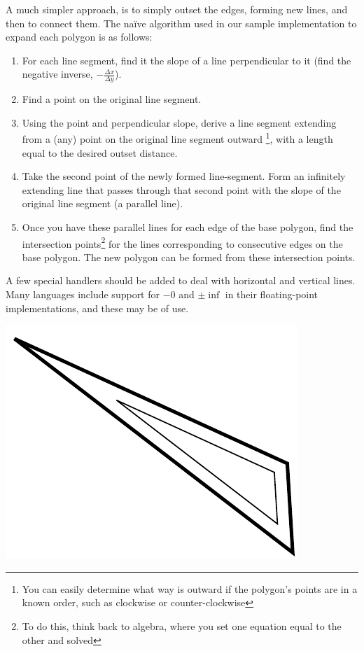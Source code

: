\documentclass[letterpaper, 12pt]{article}
\begin{document}
\begin{multicols}{2}
A much simpler approach, is to simply outset the edges, forming new lines, and
then to connect them. The na\"ive algorithm used in our sample implementation to
expand each polygon is as follows:

\begin{enumerate}

    \item For each line segment, find it the slope of a line perpendicular to it
          (find the negative inverse, \(-\frac{\Delta x}{\Delta y}\)).
    \item Find a point on the original line segment.
    \item Using the point and perpendicular slope, derive a line segment
          extending from a (any) point on the original line segment outward
          \footnote{You can easily determine what way is outward if the
          polygon's points are in a known order, such as clockwise or
          counter-clockwise}, with a length equal to the desired outset
          distance.
    \item Take the second point of the newly formed line-segment. Form an
          infinitely extending line that passes through that second point with
          the slope of the original line segment (a parallel line).
    \item Once you have these parallel lines for each edge of the base polygon,
          find the intersection points\footnote{To do this, think back to
          algebra, where you set one equation equal to the other and solved} for
          the lines corresponding to consecutive edges on the base polygon. The
          new polygon can be formed from these intersection points.

\end{enumerate}

A few special handlers should be added to deal with horizontal and vertical
lines. Many languages include support for \(-0\) and \(\pm\inf\) in their
floating-point implementations, and these may be of use.

\noindent\includegraphics[width=\columnwidth]{img/simple_outset_acute.pdf}


\end{multicols}
\end{document}
